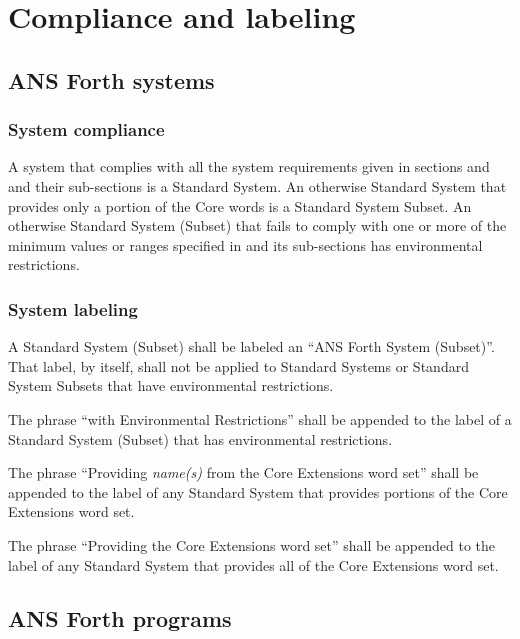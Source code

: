 \resetlinenumber
\chapter{Compliance and labeling}
\label{label}

\section{ANS Forth systems} %
\label{label:label}

\subsection{System compliance} %
\label{label:system}

A system that complies with all the system requirements given in
sections  and
 and their sub-sections is
a Standard System. An otherwise Standard System that provides only
a portion of the Core words is a Standard System Subset. An
otherwise Standard System (Subset) that fails to comply with one or
more of the minimum values or ranges specified in
 and its sub-sections has
environmental restrictions.

\subsection{System labeling} %

A Standard System (Subset) shall be labeled an ``ANS Forth System
(Subset)''. That label, by itself, shall not be applied to Standard
Systems or Standard System Subsets that have environmental
restrictions.

The phrase ``with Environmental Restrictions'' shall be appended to
the label of a Standard System (Subset) that has environmental
restrictions.

The phrase ``Providing \emph{name(s)} from the Core Extensions word
set'' shall be appended to the label of any Standard System that
provides portions of the Core Extensions word set.

The phrase ``Providing the Core Extensions word set'' shall be
appended to the label of any Standard System that provides all of
the Core Extensions word set.


\section{ANS Forth programs} %


